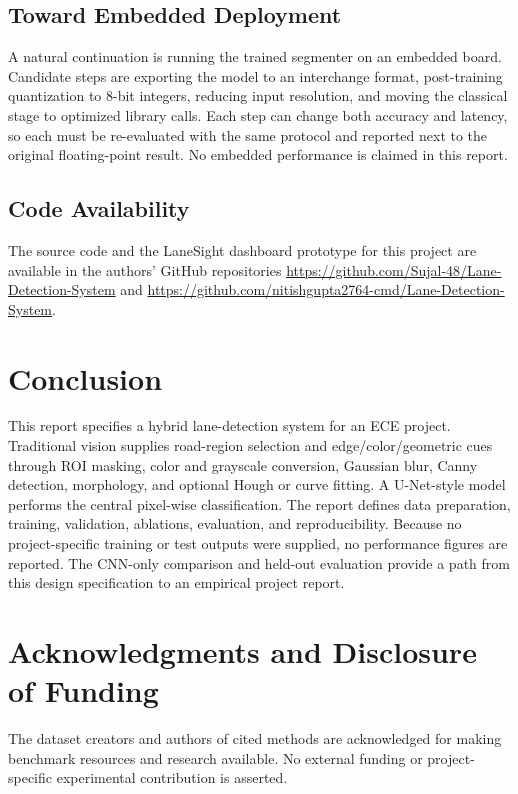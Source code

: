 \documentclass[10pt,a4paper,twocolumn]{article}
\begin{document}
\subsection{Toward Embedded Deployment}
A natural continuation is running the trained segmenter on an embedded board. Candidate steps are exporting the model to an interchange format, post-training quantization to 8-bit integers, reducing input resolution, and moving the classical stage to optimized library calls. Each step can change both accuracy and latency, so each must be re-evaluated with the same protocol and reported next to the original floating-point result. No embedded performance is claimed in this report.

\subsection{Code Availability}
The source code and the LaneSight dashboard prototype for this project are available in the authors' GitHub repositories \url{https://github.com/Sujal-48/Lane-Detection-System} and \url{https://github.com/nitishgupta2764-cmd/Lane-Detection-System}.

\section{Conclusion}
This report specifies a hybrid lane-detection system for an ECE project. Traditional vision supplies road-region selection and edge/color/geometric cues through ROI masking, color and grayscale conversion, Gaussian blur, Canny detection, morphology, and optional Hough or curve fitting. A U-Net-style model performs the central pixel-wise classification. The report defines data preparation, training, validation, ablations, evaluation, and reproducibility. Because no project-specific training or test outputs were supplied, no performance figures are reported. The CNN-only comparison and held-out evaluation provide a path from this design specification to an empirical project report.

\section*{Acknowledgments and Disclosure of Funding}
The dataset creators and authors of cited methods are acknowledged for making benchmark resources and research available. No external funding or project-specific experimental contribution is asserted.

\appendix
{}
\end{document}

